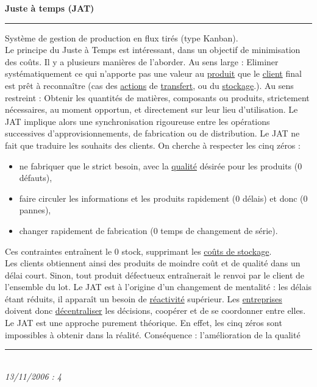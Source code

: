 \documentclass[12pt,a4paper,twoside]{article}
\newcommand{\definition}[3]{
	\begin{minipage}{\textwidth}
		\textbf{\large{#1}}\\
		\rule{\textwidth}{0.5pt}
		#2\\
		\ifthenelse{\isempty{#3}}%
	    {}%
	    {\rule{\textwidth}{0.25pt}\\\textit{#3}}%
    \end{minipage}
    \\\\
}
\begin{document}
\definition{Juste à temps (JAT)}
{
	Système de gestion de production en flux tirés (type Kanban).\\
	Le principe du Juste à Temps est intéressant, dans un objectif de minimisation des coûts. Il y a plusieurs manières de l'aborder.
	Au sens large : Eliminer systématiquement ce qui n'apporte pas une valeur au \href{http://gpr.insa-lyon.fr/supgedem/Home/Le_monde_industriel/L_entreprise/L_etude_industrialisation/leproduit.htm}{produit} que le \href{http://gpr.insa-lyon.fr/supgedem/Home/glossaire/gLESCLIENTS.htm}{client} final est prêt à reconnaître (cas des \href{http://gpr.insa-lyon.fr/supgedem/Home/glossaire/gLeSACTIONS.htm}{actions} de \href{http://gpr.insa-lyon.fr/supgedem/Home/glossaire/gLetransfert.htm}{transfert}, ou du \href{http://gpr.insa-lyon.fr/supgedem/Home/glossaire/gLestock.htm}{stockage}.).
	Au sens restreint : Obtenir les quantités de matières, composants ou produits, strictement nécessaires, au moment opportun, et directement sur leur lieu d'utilisation. Le JAT implique alors une synchronisation rigoureuse entre les opérations successives d'approvisionnements, de fabrication ou de distribution.
	Le JAT ne fait que traduire les souhaits des clients. On cherche à respecter les cinq zéros :
	\begin{itemize}
	\item ne fabriquer que le strict besoin, avec la \href{http://gpr.insa-lyon.fr/supgedem/Home/glossaire/gLaqualite.htm}{qualité} désirée pour les produits (0 défauts),
	\item faire circuler les informations et les produits rapidement (0 délais) et donc (0 pannes),
	\item changer rapidement de fabrication (0 temps de changement de série).
	\end{itemize}
	Ces contraintes entraînent le 0 stock, supprimant les \href{http://gpr.insa-lyon.fr/supgedem/Home/glossaire/glescouts.htm}{coûts de stockage}.\\
	Les clients obtiennent ainsi des produits de moindre coût et de qualité dans un délai court. Sinon, tout produit défectueux entraînerait le renvoi par le client de l'ensemble du lot.
	Le JAT est à l'origine d'un changement de mentalité : les délais étant réduits, il apparaît un besoin de \href{http://gpr.insa-lyon.fr/supgedem/Home/glossaire/glareactivite.htm}{réactivité} supérieur. Les \href{http://gpr.insa-lyon.fr/supgedem/Home/Le_monde_industriel/L_entreprise/lentreprise.htm}{entreprises} doivent donc \href{http://gpr.insa-lyon.fr/supgedem/Home/glossaire/gLadecentralisation.htm}{décentraliser} les décisions, coopérer et de se coordonner entre elles.
	Le JAT est une approche purement théorique. En effet, les cinq zéros sont impossibles à obtenir dans la réalité.
	Conséquence : l'amélioration de la qualité
	}{13/11/2006 : 4}
		
\end{document}
